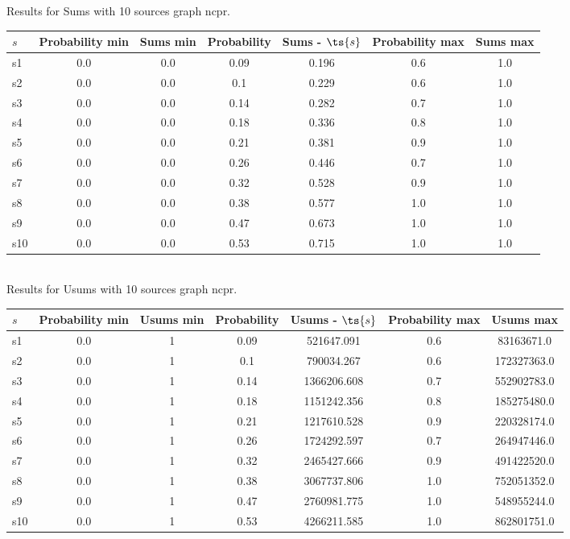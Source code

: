 \documentclass{article}
\begin{document}
\noindent Results for Sums with 10 sources graph ncpr.

\noindent\begin{tabular}{|l|c|c|c|c|c|c|}
\hline
$s$& Probability min & Sums min & Probability & Sums - $\ts{s}$ & Probability max & Sums max\\
\hline
s1 &0.0 & 0.0 & 0.09 & 0.196 & 0.6 & 1.0\\
\hline
s2 &0.0 & 0.0 & 0.1 & 0.229 & 0.6 & 1.0\\
\hline
s3 &0.0 & 0.0 & 0.14 & 0.282 & 0.7 & 1.0\\
\hline
s4 &0.0 & 0.0 & 0.18 & 0.336 & 0.8 & 1.0\\
\hline
s5 &0.0 & 0.0 & 0.21 & 0.381 & 0.9 & 1.0\\
\hline
s6 &0.0 & 0.0 & 0.26 & 0.446 & 0.7 & 1.0\\
\hline
s7 &0.0 & 0.0 & 0.32 & 0.528 & 0.9 & 1.0\\
\hline
s8 &0.0 & 0.0 & 0.38 & 0.577 & 1.0 & 1.0\\
\hline
s9 &0.0 & 0.0 & 0.47 & 0.673 & 1.0 & 1.0\\
\hline
s10 &0.0 & 0.0 & 0.53 & 0.715 & 1.0 & 1.0\\
\hline
\end{tabular}\\

\noindent Results for Usums with 10 sources graph ncpr.

\noindent\begin{tabular}{|l|c|c|c|c|c|c|}
\hline
$s$& Probability min & Usums min & Probability & Usums - $\ts{s}$ & Probability max & Usums max\\
\hline
s1 &0.0 & 1 & 0.09 & 521647.091 & 0.6 & 83163671.0\\
\hline
s2 &0.0 & 1 & 0.1 & 790034.267 & 0.6 & 172327363.0\\
\hline
s3 &0.0 & 1 & 0.14 & 1366206.608 & 0.7 & 552902783.0\\
\hline
s4 &0.0 & 1 & 0.18 & 1151242.356 & 0.8 & 185275480.0\\
\hline
s5 &0.0 & 1 & 0.21 & 1217610.528 & 0.9 & 220328174.0\\
\hline
s6 &0.0 & 1 & 0.26 & 1724292.597 & 0.7 & 264947446.0\\
\hline
s7 &0.0 & 1 & 0.32 & 2465427.666 & 0.9 & 491422520.0\\
\hline
s8 &0.0 & 1 & 0.38 & 3067737.806 & 1.0 & 752051352.0\\
\hline
s9 &0.0 & 1 & 0.47 & 2760981.775 & 1.0 & 548955244.0\\
\hline
s10 &0.0 & 1 & 0.53 & 4266211.585 & 1.0 & 862801751.0\\
\hline
\end{tabular}\\
\end{document}
